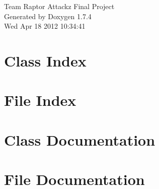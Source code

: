 \documentclass[a4paper]{book}
\begin{document}
\hypersetup{pageanchor=false}
\begin{titlepage}
\vspace*{7cm}
\begin{center}
{\Large Team Raptor Attackz Final Project }\\
\vspace*{1cm}
{\large Generated by Doxygen 1.7.4}\\
\vspace*{0.5cm}
{\small Wed Apr 18 2012 10:34:41}\\
\end{center}
\end{titlepage}
\clearemptydoublepage
{}
\tableofcontents
\clearemptydoublepage
{}
\hypersetup{pageanchor=true}
\chapter{Class Index}

\chapter{File Index}

\chapter{Class Documentation}



\chapter{File Documentation}





















\printindex
\end{document}
